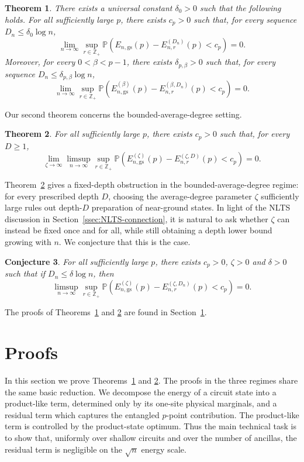 \documentclass[12pt]{article}
\newtheorem{theorem}{Theorem}
\newtheorem{conjecture}[theorem]{Conjecture}
\renewcommand{\P}{\mathbb{P}}
\begin{document}
\begin{theorem}\label{thm:main-meanfield-gap}
There exists a universal constant \(\delta_0>0\) such that the following holds. For all sufficiently large \(p\), there exists \(c_p>0\) such that, for every sequence \(D_n\le \delta_0\log n\),
\[
\lim_{n\to\infty}
\sup_{r\in\mathbb Z_+}
\P\left(
    E_{n,\mathrm{gs}}(p)-E_{n,r}^{(D_n)}(p)<c_p
\right)
=0.
\]
Moreover, for every \(0<\beta<p-1\), there exists
\(\delta_{p,\beta}>0\) such that, for every sequence
\(D_n\le \delta_{p,\beta}\log n\),
\[
\lim_{n\to\infty}
\sup_{r\in\mathbb Z_+}
\P\left(
    E_{n,\mathrm{gs}}^{(\beta)}(p)
    -
    E_{n,r}^{(\beta,D_n)}(p)
    < c_p
\right)
=0.
\]
\end{theorem}

Our second theorem concerns the bounded-average-degree setting.
\begin{theorem}
\label{thm:main-critical-gap}
For all sufficiently large $p$, there exists \(c_p>0\) such that, for every
 \(D\ge1\),
\[
\lim_{\zeta\to\infty}
\limsup_{n\to\infty}
\sup_{r\in\mathbb Z_+}
\P\left(
    E_{n,\mathrm{gs}}^{(\zeta)}(p)
    -
    E_{n,r}^{(\zeta,D)}(p)
    < c_p
\right)
=0.
\]
\end{theorem}
Theorem~\ref{thm:main-critical-gap} gives a fixed-depth obstruction in the bounded-average-degree regime: for every prescribed depth \(D\), choosing the average-degree parameter \(\zeta\) sufficiently large rules out depth-\(D\) preparation of near-ground states. In light of the NLTS discussion in
Section~\ref{ssec:NLTS-connection}, it is natural to ask whether \(\zeta\) can instead be fixed once and for all, while still obtaining a depth lower bound growing with \(n\). We conjecture that this is the case.
\begin{conjecture}
For all sufficiently large $p$, there exists \(c_p>0\), $\zeta>0$ and $\delta>0$ such that if
 \(D_n\le \delta \log n\), then
\[
\limsup_{n\to\infty}
\sup_{r\in\mathbb Z_+}
\P\left(
    E_{n,\mathrm{gs}}^{(\zeta)}(p)
    -
    E_{n,r}^{(\zeta,D_n)}(p)
    < c_p
\right)
=0.
\]
\end{conjecture}

The proofs of Theorems~\ref{thm:main-meanfield-gap} and
\ref{thm:main-critical-gap} are found in Section~\ref{sec:proofs}.



\section{Proofs}\label{sec:proofs}
In this section we prove Theorems~\ref{thm:main-meanfield-gap} and
\ref{thm:main-critical-gap}. The proofs in the three regimes share the same
basic reduction. We decompose the energy of a circuit state into a product-like
term, determined only by its one-site physical marginals, and a residual term
which captures the entangled \(p\)-point contribution. The
product-like term is controlled by the product-state optimum. Thus the main
technical task is to show that, uniformly over shallow circuits and over the
number of ancillas, the residual term is negligible on the \(\sqrt n\) energy
scale.
\end{document}
